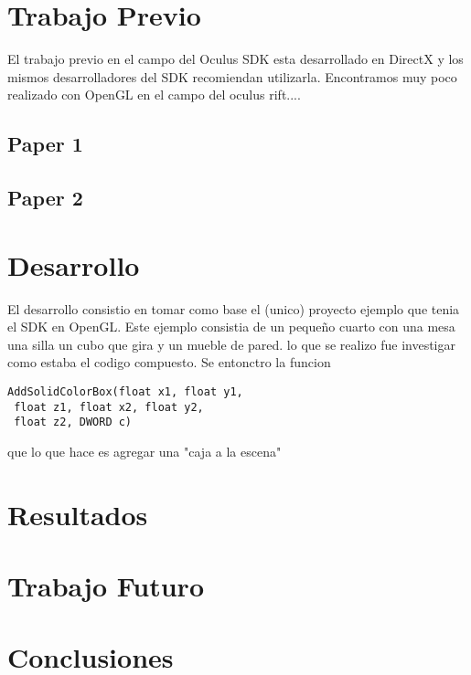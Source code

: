 \documentclass[10pt, a4paper, twocolumn]{article}
\begin{document}
\section{Trabajo Previo}

El trabajo previo en el campo del Oculus SDK esta desarrollado en DirectX y los mismos desarrolladores del SDK recomiendan utilizarla. Encontramos muy poco realizado con OpenGL en el campo del oculus rift....


\subsection{Paper 1}




\subsection{Paper 2}


\section{Desarrollo}
El desarrollo consistio en tomar como base el (unico) proyecto ejemplo que tenia el SDK en OpenGL. Este ejemplo consistia de un pequeño cuarto con una mesa una silla un cubo que gira y un mueble de pared. lo que se realizo fue investigar como estaba el codigo compuesto. Se entonctro la funcion
\begin{lstlisting}
AddSolidColorBox(float x1, float y1,
 float z1, float x2, float y2, 
 float z2, DWORD c)
\end{lstlisting}
que lo que hace es agregar una "caja a la escena"


\section{Resultados}

\section{Trabajo Futuro}

\section{Conclusiones}

\printbibliography[{title = "example.bib" }] %

\end{document}
